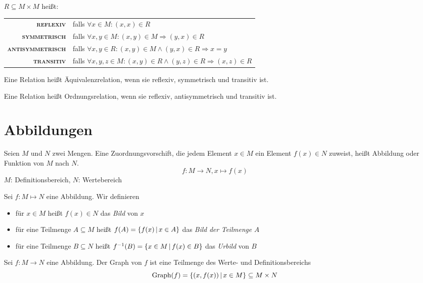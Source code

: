 \par\medskip

$R \subseteq M\times M$ heißt:

\medskip
\renewcommand{\arraystretch}{1.4}
\begin{tabular}{>{\bfseries\scshape}r l}
	reflexiv & falls $\forall x\in M : (x,x)\in R$\\
	symmetrisch & falls $\forall x,y \in M : (x,y)\in M \Rightarrow (y,x) \in R$\\
	antisymmetrisch & falls $\forall x,y \in R : (x,y)\in M \wedge (y,x)\in R \Rightarrow x=y$\\
	transitiv & falls $\forall x,y,z \in M : (x,y)\in R \wedge (y,z)\in R \Rightarrow (x,z)\in R$
\end{tabular}
\medskip

Eine Relation heißt Äquivalenzrelation, wenn sie reflexiv, symmetrisch und transitiv ist.

Eine Relation heißt Ordnungsrelation, wenn sie reflexiv, antisymmetrisch und transitiv ist.

\section{Abbildungen}
Seien $M$ und $N$ zwei Mengen. Eine Zuordnungsvorschift, die jedem Element $x\in M$ ein Element $f(x)\in N$ zuweist, heißt Abbildung oder Funktion von $M$ nach $N$.
\begin{equation*}
  f:M\rightarrow N, x\mapsto f(x)
\end{equation*}
$M$: Definitionsbereich, $N$: Wertebereich

Sei $f:M\mapsto N$ eine Abbildung. Wir definieren
\begin{itemize}
  \item für $x\in M$ heißt $f(x)\in N$ das \emph{Bild} von $x$
  \item für eine Teilmenge $A\subseteq M$ heißt $f(A)=\left\{ f(x) \,\middle|\, x\in A \right\}$ das \emph{Bild der Teilmenge  $A$}
  \item für eine Teilmenge $B\subseteq N$ heißt $f^{-1}(B) = \left\{ x\in M \,\middle|\, f(x)\in B \right\}$ das \emph{Urbild} von $B$
\end{itemize}

Sei $f:M\rightarrow N$ eine Abbildung. Der Graph von $f$ ist eine Teilmenge des Werte- und Definitionsbereichs
\begin{equation*}
	\mathrm{Graph}(f)=\left\{ (x,f(x)) \,\middle|\, x\in M \right\}\subseteq M\times N
\end{equation*}

